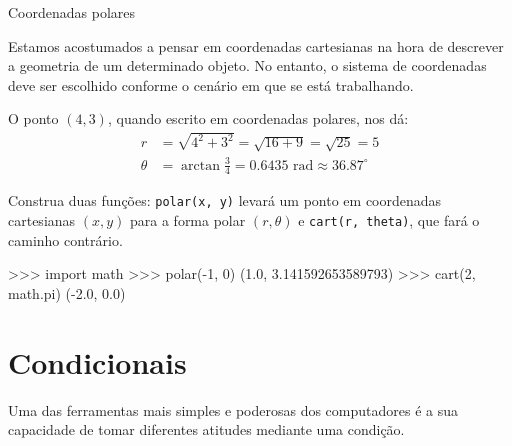     \begin{problem}{Coordenadas polares}
        
        Estamos acostumados a pensar em coordenadas cartesianas na hora de descrever a geometria de um determinado objeto. No entanto, o sistema de coordenadas deve ser escolhido conforme o cenário em que se está trabalhando.
        
        
        
        O ponto $(4, 3)$, quando escrito em coordenadas polares, nos dá:
        \begin{align*}
        r &= \sqrt{4^2 + 3^2} = \sqrt{16 + 9} = \sqrt{25} = 5\\
        \theta &= \arctan\frac{3}{4} = 0.6435 \text{ rad} \approx 36.87^{\circ}
        \end{align*}
        
        \proposal
		Construa duas funções: \texttt{polar(x, y)} levará um ponto em coordenadas cartesianas $(x, y)$ para a forma polar $(r, \theta)$ e \texttt{cart(r, theta)}, que fará o caminho contrário.\par
        
        \begin{lstpython}
    >>> import math
    >>> polar(-1, 0)
    (1.0, 3.141592653589793)
    >>> cart(2, math.pi)
    (-2.0, 0.0)
        \end{lstpython}
        
    \end{problem}

	\section*{Condicionais}%
	Uma das ferramentas mais simples e poderosas dos computadores é a sua capacidade de tomar diferentes atitudes mediante uma condição. 

